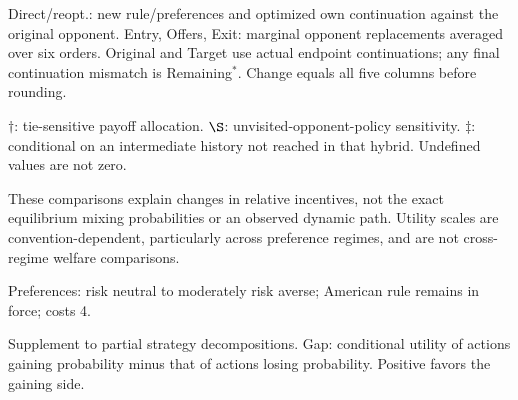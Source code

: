 \documentclass[10pt]{article}
\begin{document}
{Direct/reopt.: new rule/preferences and optimized own continuation against the original opponent. Entry, Offers, Exit: marginal opponent replacements averaged over six orders. Original and Target use actual endpoint continuations; any final continuation mismatch is Remaining$^*$. Change equals all five columns before rounding.\par
$\dagger$: tie-sensitive payoff allocation. $\S$: unvisited-opponent-policy sensitivity. $\ddagger$: conditional on an intermediate history not reached in that hybrid. Undefined values are not zero.\par
These comparisons explain changes in relative incentives, not the exact equilibrium mixing probabilities or an observed dynamic path. Utility scales are convention-dependent, particularly across preference regimes, and are not cross-regime welfare comparisons.}\par
{}\par
Preferences: risk neutral to moderately risk averse; American rule remains in force; costs 4.\par
{\small Supplement to partial strategy decompositions. Gap: conditional utility of actions gaining probability minus that of actions losing probability. Positive favors the gaining side.}\par
\end{document}
